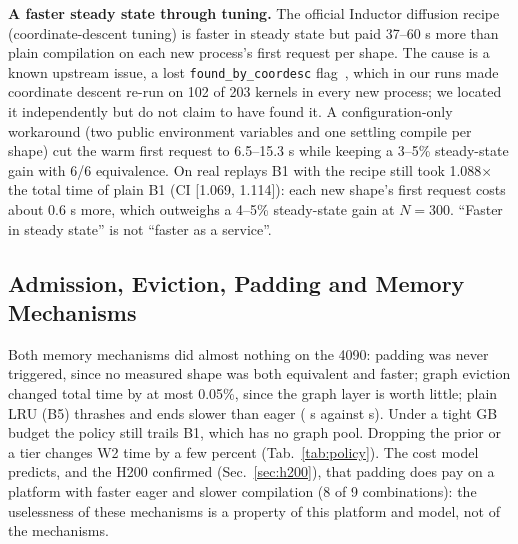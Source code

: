 \documentclass[conference]{IEEEtran}
\newcommand{\tn}[1]{#1}%
\begin{document}
\textbf{A faster steady state through tuning.} The official Inductor diffusion recipe (coordinate-descent tuning) is faster in steady state but paid \tn{37--60 s} more than plain compilation on each new process's first request per shape. The cause is a known upstream issue, a lost \texttt{found\_by\_coordesc} flag~\cite{pt_issue,pt_pr}, which in our runs made coordinate descent re-run on \tn{102} of \tn{203} kernels in every new process; we located it independently but do not claim to have found it. A configuration-only workaround (two public environment variables and one settling compile per shape) cut the warm first request to \tn{6.5--15.3 s} while keeping a \tn{3--5\%} steady-state gain with 6/6 equivalence. On real replays B1 with the recipe still took \tn{1.088}$\times$ the total time of plain B1 (CI [\tn{1.069}, \tn{1.114}]): each new shape's first request costs about \tn{0.6 s} more, which outweighs a \tn{4--5\%} steady-state gain at $N{=}300$. ``Faster in steady state'' is not ``faster as a service''.


\subsection{Admission, Eviction, Padding and Memory Mechanisms}
Both memory mechanisms did almost nothing on the 4090: padding was never triggered, since no measured shape was both equivalent and faster; graph eviction changed total time by at most \tn{0.05\%}, since the graph layer is worth little; plain LRU (B5) thrashes and ends slower than eager (\NTabAblLruWtwoSec{} s against \NTabAblBZeroWtwoSec{} s). Under a tight \NTabTightBudgetGB{} GB budget the policy still trails B1, which has no graph pool. Dropping the prior or a tier changes W2 time by a few percent (Tab.~\ref{tab:policy}). The cost model predicts, and the H200 confirmed (Sec.~\ref{sec:h200}), that padding does pay on a platform with faster eager and slower compilation (\tn{8 of 9} combinations): the uselessness of these mechanisms is a property of this platform and model, not of the mechanisms.
\end{document}
